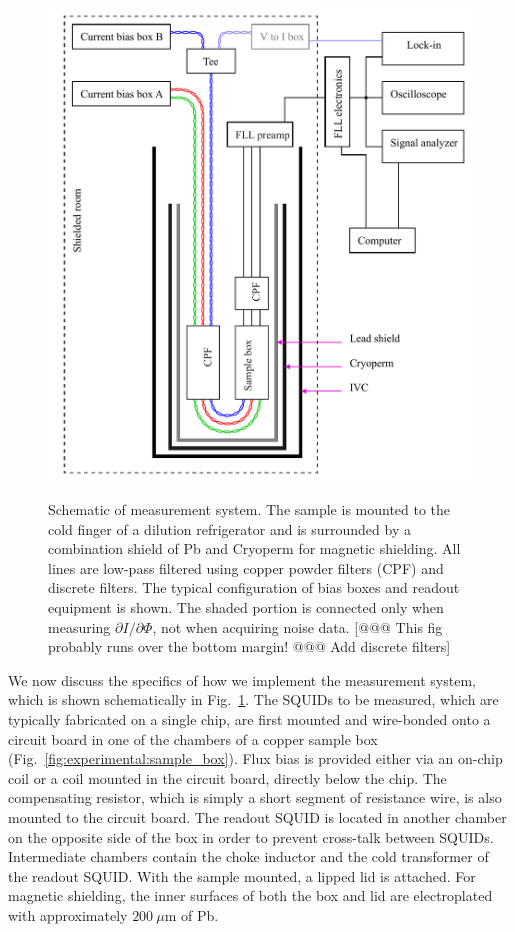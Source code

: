 \begin{figure}
\centering\includegraphics{experimental/Fig_meas_schematic}\\
\caption[Schematic of measurement system]{Schematic of measurement system. The sample is mounted to the cold finger of a dilution refrigerator and is surrounded by a combination shield of Pb and Cryoperm for magnetic shielding. All lines are low-pass filtered using copper powder filters (CPF) and discrete filters. The typical configuration of bias boxes and readout equipment is shown. The shaded portion is connected only when measuring $\partial I/\partial \Phi$, not when acquiring noise data. [@@@ This fig probably runs over the bottom margin! @@@ Add discrete filters]}
\label{fig:experimental:meas_schem}
\end{figure}

We now discuss the specifics of how we implement the measurement system, which is shown schematically in Fig.~\ref{fig:experimental:meas_schem}. The SQUIDs to be measured, which are typically fabricated on a single chip, are first mounted and wire-bonded onto a circuit board in one of the chambers of a copper sample box (Fig.~\ref{fig:experimental:sample_box}). Flux bias is provided either via an on-chip coil or a coil mounted in the circuit board, directly below the chip. The compensating resistor, which is simply a short segment of resistance wire, is also mounted to the circuit board. The readout SQUID is located in another chamber on the opposite side of the box in order to prevent cross-talk between SQUIDs. Intermediate chambers contain the choke inductor and the cold transformer of the readout SQUID. With the sample mounted, a lipped lid is attached. For magnetic shielding, the inner surfaces of both the box and lid are electroplated with approximately $200~\mu$m of Pb.

